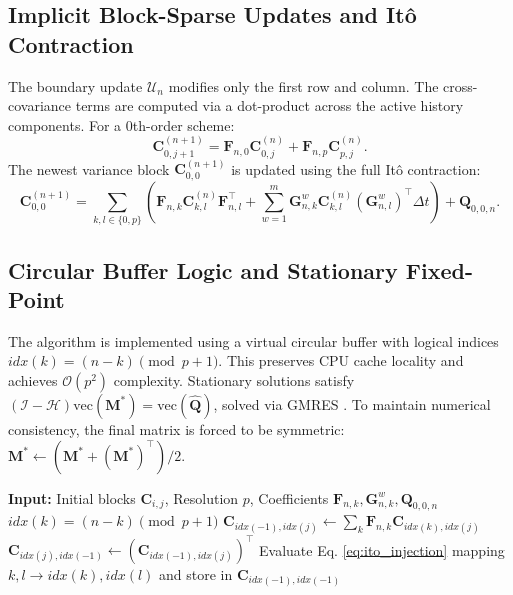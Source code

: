 \documentclass[preprint,12pt]{elsarticle}
\begin{document}
\subsection{Implicit Block-Sparse Updates and It\^o Contraction}
The boundary update $\mathcal{U}_n$ modifies only the first row and column. The cross-covariance terms are computed via a dot-product across the active history components. For a 0th-order scheme:
\begin{equation}
\mathbf{C}_{0,j+1}^{(n+1)} = \mathbf{F}_{n,0} \mathbf{C}_{0,j}^{(n)} + \mathbf{F}_{n,p} \mathbf{C}_{p,j}^{(n)}.
\end{equation}
The newest variance block $\mathbf{C}_{0,0}^{(n+1)}$ is updated using the full It\^o contraction:
\begin{equation}
\label{eq:ito_injection}
\mathbf{C}_{0,0}^{(n+1)} = \sum_{k,l \in \{0,p\}} \left( \mathbf{F}_{n,k} \mathbf{C}_{k,l}^{(n)} \mathbf{F}_{n,l}^\top + \sum_{w=1}^m \mathbf{G}_{n,k}^w \mathbf{C}_{k,l}^{(n)} (\mathbf{G}_{n,l}^w)^\top \Delta t \right) + \mathbf{Q}_{0,0,n}.
\end{equation}

\subsection{Circular Buffer Logic and Stationary Fixed-Point}
The algorithm is implemented using a virtual circular buffer with logical indices $idx(k) = (n-k) \pmod{p+1}$. This preserves CPU cache locality and achieves $\mathcal{O}(p^2)$ complexity. Stationary solutions satisfy $(\mathcal{I} - \mathcal{H}) \text{vec}(\mathbf{M}^*) = \text{vec}(\hat{\mathbf{Q}})$, solved via GMRES \cite{Saad1986, Zhou2024}. To maintain numerical consistency, the final matrix is forced to be symmetric: $\mathbf{M}^* \leftarrow (\mathbf{M}^* + (\mathbf{M}^*)^\top)/2$.

\begin{algorithm}
\caption{MF-SSDM Circular Buffer Propagation}
\label{alg:mfsd_detailed}
\begin{algorithmic}[1]
\STATE \textbf{Input:} Initial blocks $\mathbf{C}_{i,j}$, Resolution $p$, Coefficients $\mathbf{F}_{n,k}, \mathbf{G}_{n,k}^w, \mathbf{Q}_{0,0,n}$
    \STATE $idx(k) = (n - k) \pmod{p+1}$
        \STATE $\mathbf{C}_{idx(-1), idx(j)} \leftarrow \sum_{k} \mathbf{F}_{n,k} \mathbf{C}_{idx(k), idx(j)}$
        \STATE $\mathbf{C}_{idx(j), idx(-1)} \leftarrow (\mathbf{C}_{idx(-1), idx(j)})^\top$
    \ENDFOR
    \STATE Evaluate Eq. \eqref{eq:ito_injection} mapping $k, l \to idx(k), idx(l)$ and store in $\mathbf{C}_{idx(-1), idx(-1)}$
\ENDFOR
\end{algorithmic}
\end{algorithm}
\end{document}
